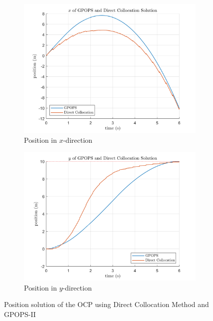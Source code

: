 \begin{figure}[ht]
	\begin{subfigure}[b]{0.49\linewidth}
		\includegraphics[width=\linewidth]{figures/GpopsDcolX.png}
		\caption{Position in $x$-direction}
		\label{fig:dircol_x}
	\end{subfigure}
	\hfill
	\begin{subfigure}[b]{0.49\linewidth}
		\includegraphics[width=\linewidth]{figures/GpopsDcolY.png}
		\caption{Position in $y$-direction}
		\label{fig:dircol_y}
	\end{subfigure}
	\centering
	\caption{Position solution of the OCP using Direct Collocation Method and GPOPS-II}
	\label{fig:dircol_gpops_pos}
\end{figure}

